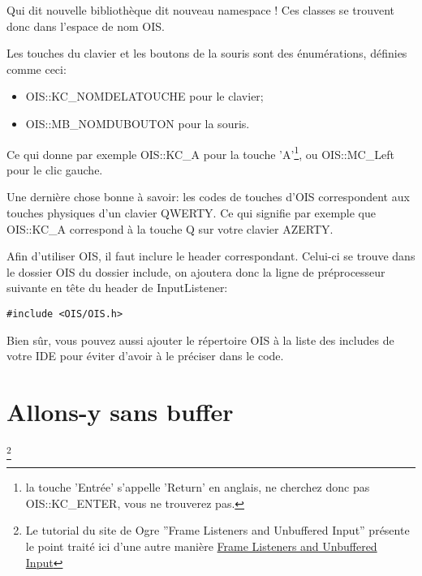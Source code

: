 Qui dit nouvelle biblioth\`eque dit nouveau namespace ! Ces classes se trouvent donc dans l'espace de nom OIS.\newline

Les touches du clavier et les boutons de la souris sont des \'enum\'erations, d\'efinies comme ceci:

\begin{itemize}
\item OIS::KC\_NOMDELATOUCHE pour le clavier;
\item OIS::MB\_NOMDUBOUTON pour la souris.
\end{itemize}


Ce qui donne par exemple OIS::KC\_A pour la touche 'A'\footnote{la touche 'Entr\'ee' s'appelle 'Return' en anglais, ne cherchez donc pas OIS::KC\_ENTER, vous ne trouverez pas.}, ou OIS::MC\_Left pour le clic gauche.\newline

Une derni\`ere chose bonne \`{a} savoir: les codes de touches d'OIS correspondent aux touches physiques d'un clavier QWERTY. Ce qui signifie par exemple que OIS::KC\_A correspond \`{a} la touche Q sur votre clavier AZERTY.\newline

Afin d'utiliser OIS, il faut inclure le header correspondant. Celui-ci se trouve dans le dossier OIS du dossier include, on ajoutera donc la ligne de pr\'eprocesseur suivante en t\^ete du header de InputListener:

\begin{lstlisting}[caption={Include OIS}]
#include <OIS/OIS.h>
\end{lstlisting}

Bien s\^ur, vous pouvez aussi ajouter le r\'epertoire OIS \`{a} la liste des includes de votre IDE pour \'eviter d'avoir \`{a} le pr\'eciser dans le code.




























\section{Allons-y sans buffer}\footnote{Le tutorial du site de Ogre ''Frame Listeners and Unbuffered Input'' pr\'esente le point trait\'e ici d'une autre mani\`ere \href{http://www.ogre3d.org/tikiwiki/Basic+Tutorial+4}{Frame Listeners and Unbuffered Input}}
